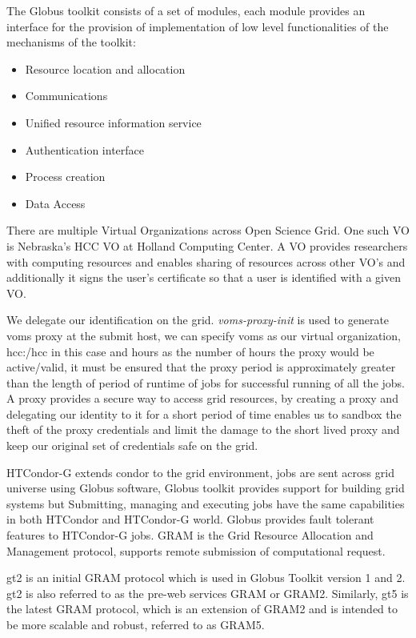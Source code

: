 \documentclass[ms,electronic,double]{nuthesis}
\begin{document}
The Globus toolkit consists of a set of modules,  each module provides an 
interface for the provision of implementation of low level functionalities of 
the mechanisms of the toolkit:

\begin{itemize}
  \item{Resource location and allocation} 
  \item{Communications}
  \item{Unified resource information service}
  \item{Authentication interface}
  \item{Process creation}
  \item{Data Access}
\end{itemize}

There are multiple Virtual Organizations across Open Science Grid. One such VO 
is Nebraska's HCC VO at Holland Computing Center. A VO provides researchers with 
computing resources and enables sharing of resources across other VO's and 
additionally it signs the user's certificate so that a user is identified with a given VO.

We delegate our identification on the grid. \emph{voms-proxy-init}
is used to generate voms proxy at the submit host, we can specify voms as our 
virtual organization, hcc:/hcc in this case and hours as the number of hours the proxy would be 
active/valid, it must be ensured that the proxy period is approximately greater than the 
length of period of runtime of jobs for successful running of all the jobs. A 
proxy provides a secure way to access grid resources, by creating a proxy and 
delegating our identity to it for a short period of time enables us to sandbox 
the theft of the proxy credentials and limit the damage to the short lived proxy 
and keep our original set of credentials safe on the grid.

HTCondor-G extends condor to the grid environment, jobs are sent across grid universe using 
Globus software, Globus toolkit provides support for building grid systems but 
Submitting, managing and executing jobs have the same capabilities in both HTCondor 
and HTCondor-G world. Globus provides fault tolerant features to HTCondor-G 
jobs. GRAM is the Grid Resource Allocation and Management protocol, supports remote 
submission of computational request.

gt2 is an initial GRAM protocol which is used in Globus Toolkit version 1 and 
2. gt2 is also referred to as the pre-web services GRAM or GRAM2. Similarly, gt5 is the latest GRAM protocol, which is an extension of GRAM2 and is intended 
to be more scalable and robust, referred to as GRAM5.
\end{document}
